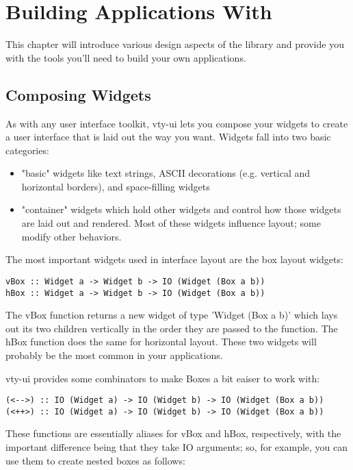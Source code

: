 \chapter{Building Applications With }

This chapter will introduce various design aspects of the library and
provide you with the tools you'll need to build your own 
applications.

\section{Composing Widgets}

As with any user interface toolkit, vty-ui lets you compose your widgets
to create a user interface that is laid out the way you want.  Widgets
fall into two basic categories:

\begin{itemize}
\item "basic" widgets like text strings, ASCII decorations
      (e.g. vertical and horizontal borders), and space-filling
      widgets
\item "container" widgets which hold other widgets and control how
      those widgets are laid out and rendered.  Most of these widgets
      influence layout; some modify other behaviors.
\end{itemize}

The most important widgets used in interface layout are the box layout
widgets:

\begin{verbatim}
vBox :: Widget a -> Widget b -> IO (Widget (Box a b))
hBox :: Widget a -> Widget b -> IO (Widget (Box a b))
\end{verbatim}

The vBox function returns a new widget of type 'Widget (Box a b)' which
lays out its two children vertically in the order they are passed to the
function.  The hBox function does the same for horizontal layout.  These
two widgets will probably be the most common in your applications.

vty-ui provides some combinators to make Boxes a bit eaiser to work
with:

\begin{verbatim}
(<-->) :: IO (Widget a) -> IO (Widget b) -> IO (Widget (Box a b))
(<++>) :: IO (Widget a) -> IO (Widget b) -> IO (Widget (Box a b))
\end{verbatim}

These functions are essentially aliases for vBox and hBox, respectively,
with the important difference being that they take IO arguments; so, for
example, you can use them to create nested boxes as follows:

